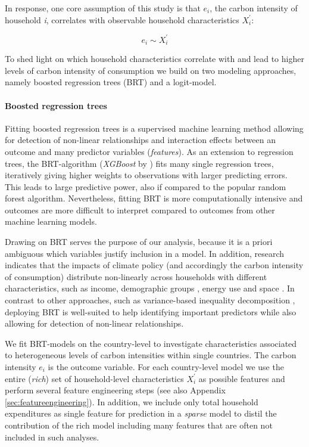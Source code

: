 \documentclass[12pt, a4paper]{article}
\begin{document}
In response, one core assumption of this study is that $e_{i}$, the carbon intensity of household \textit{i}, correlates with observable household characteristics $X_{i}^{'}$:

\begin{equation}
    e_{i} \sim X_{i}^{'}
\end{equation}


To shed light on which household characteristics correlate with and lead to higher levels of carbon intensity of consumption we build on two modeling approaches, namely boosted regression trees (BRT) and a logit-model.

\paragraph{Boosted regression trees} Fitting boosted regression trees \autocite{Friedman.2003, Elith.2008} is a supervised machine learning method allowing for detection of non-linear relationships and interaction effects between an outcome and many predictor variables (\textit{features}). As an extension to regression trees, the BRT-algorithm (\textit{XGBoost} by \textcite{Chen.2016}) fits many single regression trees, iteratively giving higher weights to observations with larger predicting errors. This leads to large predictive power, also if compared to the popular random forest algorithm. Nevertheless, fitting BRT is more computationally intensive and outcomes are more difficult to interpret compared to outcomes from other machine learning models. 

Drawing on BRT serves the purpose of our analysis, because it is a priori ambiguous which variables justify inclusion in a model. In addition, research indicates that the impacts of climate policy (and accordingly the carbon intensity of consumption) distribute non-linearly across households with different characteristics, such as income, demographic groups \autocite{Missbach.2023}, energy use \autocite{Farrell.2017} and space \autocite{Chan.2023}. In contrast to other approaches, such as variance-based inequality decomposition \autocite{Farrell.2017,Sager.2019b,Missbach.2024}, deploying BRT is well-suited to help identifying important predictors while also allowing for detection of non-linear relationships.

We fit BRT-models on the country-level to investigate characteristics associated to heterogeneous levels of carbon intensities within single countries. The carbon intensity $e_{i}$ is the outcome variable. For each country-level model we use the entire (\textit{rich}) set of household-level characteristics $X_{i}^{'}$ as possible features and perform several feature engineering steps (see also Appendix \ref{sec:featureengineering}). In addition, we include only total household expenditures as single feature for prediction in a \textit{sparse} model to distil the contribution of the rich model including many features that are often not included in such analyses.
\end{document}
